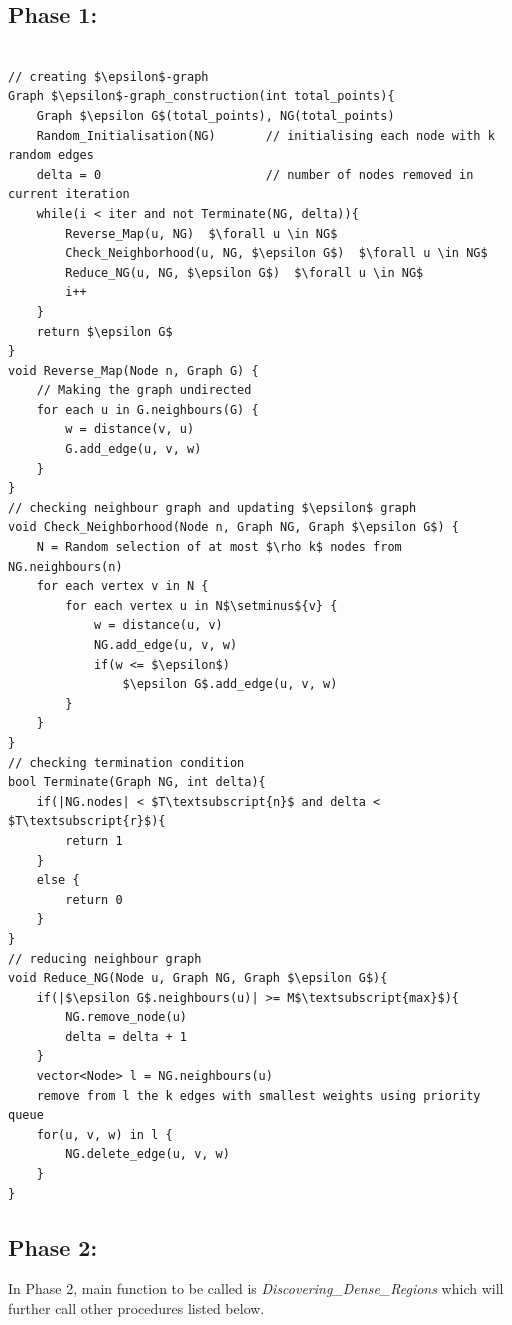 \documentclass[acmsmall]{acmart}
\begin{document}
\subsection* {Phase 1:}
\begin{lstlisting}

// creating $\epsilon$-graph
Graph $\epsilon$-graph_construction(int total_points){
	Graph $\epsilon G$(total_points), NG(total_points)
	Random_Initialisation(NG)       // initialising each node with k random edges
	delta = 0                       // number of nodes removed in current iteration
	while(i < iter and not Terminate(NG, delta)){
	    Reverse_Map(u, NG)  $\forall u \in NG$
	    Check_Neighborhood(u, NG, $\epsilon G$)  $\forall u \in NG$
	    Reduce_NG(u, NG, $\epsilon G$)  $\forall u \in NG$
        i++
    }
    return $\epsilon G$
}
void Reverse_Map(Node n, Graph G) {
    // Making the graph undirected
	for each u in G.neighbours(G) {
		w = distance(v, u)
		G.add_edge(u, v, w)
	}
}
// checking neighbour graph and updating $\epsilon$ graph
void Check_Neighborhood(Node n, Graph NG, Graph $\epsilon G$) {
    N = Random selection of at most $\rho k$ nodes from NG.neighbours(n) 
	for each vertex v in N {
		for each vertex u in N$\setminus${v} {
			w = distance(u, v)
			NG.add_edge(u, v, w)
			if(w <= $\epsilon$)
		        $\epsilon G$.add_edge(u, v, w)
        }
    }
}
// checking termination condition
bool Terminate(Graph NG, int delta){
	if(|NG.nodes| < $T\textsubscript{n}$ and delta < $T\textsubscript{r}$){
		return 1
	} 
	else {
		return 0
	}
}
// reducing neighbour graph
void Reduce_NG(Node u, Graph NG, Graph $\epsilon G$){
	if(|$\epsilon G$.neighbours(u)| >= M$\textsubscript{max}$){
	    NG.remove_node(u)
	    delta = delta + 1
	}
	vector<Node> l = NG.neighbours(u) 
	remove from l the k edges with smallest weights using priority queue
    for(u, v, w) in l {
        NG.delete_edge(u, v, w)
	}
}
\end{lstlisting}

\subsection* {Phase 2:}
In Phase 2, main function to be called is \textit{Discovering\_Dense\_Regions} which will further call other procedures listed below.
\end{document}
